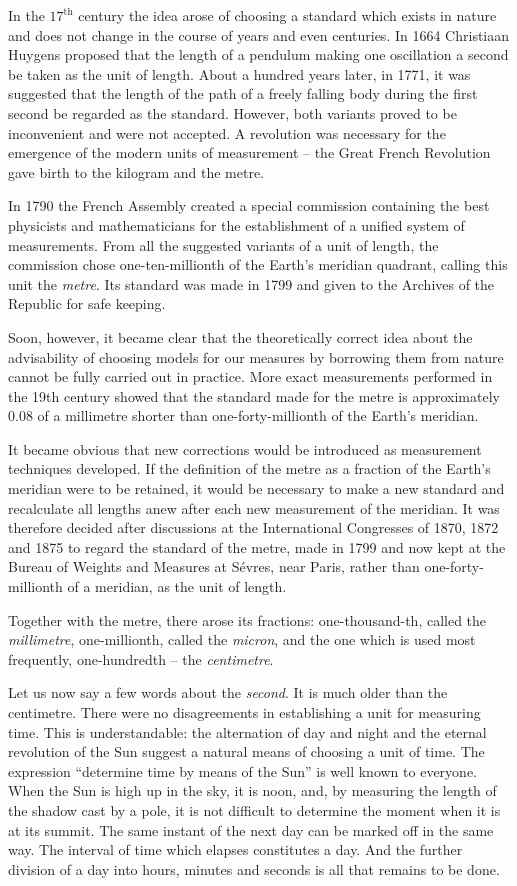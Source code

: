 In the $17^{\textrm{th}}$ century the idea arose of choosing a standard which exists in nature and does not change in the course of years and even centuries. In 1664 Christiaan Huygens proposed that the length of a pendulum making one oscillation a second be taken as the unit of length. About a hundred years later, in 1771, it was suggested that the length of the path of a freely falling body during the first second be regarded as the standard. However, both variants proved to be inconvenient and were not accepted. A revolution was necessary for the emergence of the modern units of measurement -- the Great French Revolution gave birth to the kilogram and the metre.  

In 1790 the French Assembly created a special commission containing the best physicists and mathematicians for the establishment of a unified system of measurements. From all the suggested variants of a unit of length, the commission chose one-ten-millionth of the Earth's meridian quadrant, calling this unit the \emph{metre}. Its standard was made in 1799 and given to the Archives of the Republic for safe keeping.

Soon, however, it became clear that the theoretically correct idea
about the advisability of choosing models for our measures by
borrowing them from nature cannot be fully carried out in
practice. More exact measurements performed in the 19th century showed that the standard made for the metre is approximately 0.08 of a millimetre shorter than one-forty-millionth of the Earth's meridian.

It became obvious that new corrections would be introduced as
measurement techniques developed. If the definition of the metre as a fraction of the Earth's meridian were to be retained, it would be necessary to make a new standard and recalculate all lengths anew after each new measurement of the meridian. It was therefore decided after discussions at the International Congresses of 1870, 1872 and 1875 to regard the standard of the metre,  made in 1799 and now kept at the Bureau of Weights and Measures at S\'evres, near Paris, rather than one-forty-millionth of a meridian, as the unit of length.

Together with the metre, there arose its fractions: one-thousand-th, called the \emph{millimetre}, one-millionth, called the \emph{micron}, and the one which is used most frequently, one-hundredth -- the \emph{centimetre}.  

Let us now say a few words about the \emph{second}. It is much older
than the centimetre. There were no disagreements in establishing a
unit for measuring time. This is understandable: the alternation of
day and night and the eternal revolution of the Sun suggest a natural
means of choosing a unit of time. The expression ``determine time by
means of the Sun'' is well known to everyone. When the Sun is high up
in the sky, it is noon, and, by measuring the length of the shadow
cast by a pole, it is not difficult to determine the moment when it is
at its summit. The same instant of the next day can be marked off in
the same way. The interval of time which elapses constitutes a
day. And the further division of a day into hours, minutes and seconds
is all that remains to be done.


